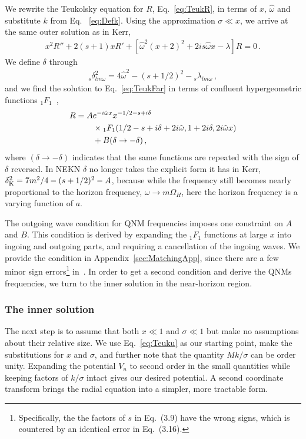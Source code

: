 \begin{refsection}
We rewrite the Teukolsky equation for $R$, Eq.~\eqref{eq:TeukR}, in terms of $x,\, \hat \omega$ and substitute $k$ from Eq.~ \eqref{eq:Defk}.
Using the approximation $\sigma\ll x$, we arrive at the same outer solution as in Kerr,
\begin{align}
\label{eq:TeukFar}
x^2 R'' + 2 (s+1) x R' + \left[\hat \omega^2 (x+2)^2 + 2 i s \hat \omega x - \lambda \right] R = 0 \,.
\end{align}
We define $\delta$ through
\begin{align}
{}_s\delta_{lm\omega}^2 = 4 \hat \omega^2 - (s+1/2)^2 - {}_s\lambda_{lm\omega} \,,
\end{align}
and we find the solution to Eq.~\eqref{eq:TeukFar} in terms of confluent hypergeometric functions ${}_1F_1$~\cite{nist},
\begin{align}
\label{eq:OuterSln}
R =  A &e^{-i \hat \omega x} x^{ -1/2 - s + i \delta} \notag \\
& \times {}_1F_1(1/2-s + i \delta + 2i \hat \omega, 1 + 2 i \delta, 2 i \hat \omega x) \notag \\
& + B (\delta \to - \delta) \,,
\end{align}
where $(\delta \to - \delta)$ indicates that the same functions are repeated with the sign of $\delta$ reversed.
In NEKN $\delta$ no longer takes the explicit form it has in Kerr, $\delta_{\rm K}^2 = 7m^2 / 4 -(s+1/2)^2 - A$, because while the frequency still becomes nearly proportional to the horizon frequency, $\omega \to m \Omega_H$, here the horizon frequency is a varying function of $a$.

The outgoing wave condition for QNM frequencies imposes one constraint on $A$ and $B$. This condition is derived by expanding the ${}_1F_1$ functions at large $x$ into ingoing and outgoing parts, and requiring a cancellation of the ingoing waves.
We provide the condition in Appendix~\ref{sec:MatchingApp}, since there are a few minor sign errors\footnote{Specifically, the the factors of $s$ in Eq.~(3.9) have the wrong signs, which is countered by an identical error in Eq.~(3.16).} in~\cite{Yang:2013uba}.
In order to get a second condition and derive the QNMs frequencies, we turn to the inner solution in the near-horizon region.

\subsubsection{The inner solution}


The next step is to assume that both $x \ll1$ and $\sigma \ll 1$ but make no assumptions about their relative size. We use Eq.~\eqref{eq:Teuku} as our starting point, make the substitutions for $x$ and $\sigma$, and further note that the quantity $M k / \sigma$ can be order unity. Expanding the potential $V_u$ to second order in the small quantities while keeping factors of $k/\sigma$ intact gives our desired potential. 
A second coordinate transform brings the radial equation into a simpler, more tractable form.


\end{refsection}
